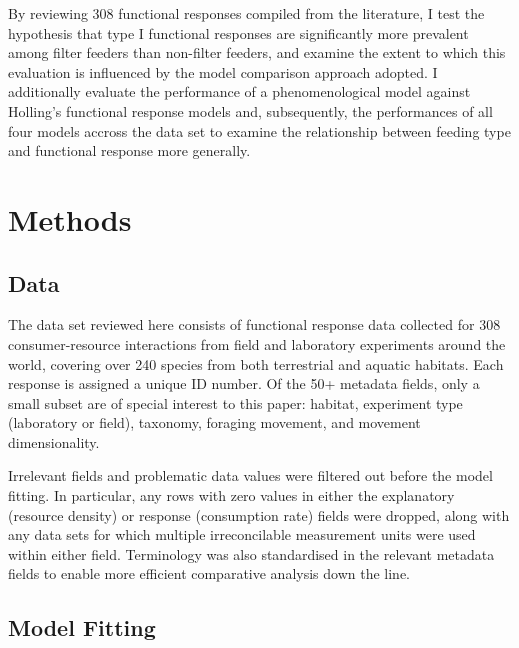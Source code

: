 \documentclass[11pt]{article}
\begin{document}
    By reviewing 308 functional responses compiled from the literature, I test the hypothesis that type I functional responses are significantly more prevalent among filter feeders than non-filter feeders, and examine the extent to which this evaluation is influenced by the model comparison approach adopted. I additionally evaluate the performance of a phenomenological model against Holling's functional response models and, subsequently, the performances of all four models accross the data set to examine the relationship between feeding type and functional response more generally.
    
    
    \section{Methods}
    
    \subsection{Data}
    The data set reviewed here consists of functional response data collected for 308 consumer-resource interactions from field and laboratory experiments around the world, covering over 240 species from both terrestrial and aquatic habitats. Each response is assigned a unique ID number. Of the 50+ metadata fields, only a small subset are of special interest to this paper: habitat, experiment type (laboratory or field), taxonomy, foraging movement, and movement dimensionality.
    
    Irrelevant fields and problematic data values were filtered out before the model fitting. In particular, any rows with zero values in either the explanatory (resource density) or response (consumption rate) fields were dropped, along with any data sets for which multiple irreconcilable measurement units were used within either field. Terminology was also standardised in the relevant metadata fields to enable more efficient comparative analysis down the line. 
    
    \subsection{Model Fitting}
    
\end{document}

